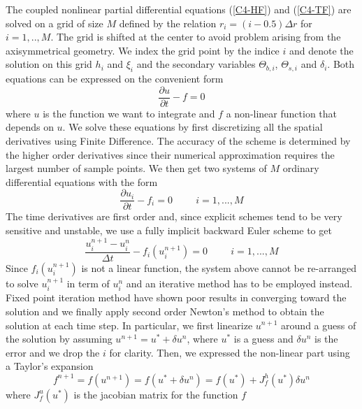 The coupled nonlinear partial differential equations (\ref{C4-HF}) and
(\ref{C4-TF}) are solved on a grid of size $M$ defined by the relation
$r_i =  (i-0.5)\Delta r$ for  $i=1,..,M$. The  grid is shifted  at the
center to avoid  problem arising from the  axisymmetrical geometry. We
index the grid point by the indice $i$ and denote the solution on this
grid  $h_i$ and  $\xi_i$ and  the secondary  variables $\Theta_{b,i}$,
$\Theta_{s,i}$ and $\delta_i$. Both equations  can be expressed on the
convenient form
\begin{equation}
  \frac{\partial u}{\partial t} - f = 0
\end{equation}
where $u$  is the function we  want to integrate and  $f$ a non-linear
function  that depends  on $u$.   We  solve these  equations by  first
discretizing all the spatial  derivatives using Finite Difference. The
accuracy of the  scheme is determined by the  higher order derivatives
since  their numerical  approximation requires  the largest  number of
sample points.  We  then get two systems of  $M$ ordinary differential
equations with the form
\begin{equation}
  \frac{\partial u_i}{\partial t} - f_i = 0 \hspace{1cm} i = 1,...,M
\end{equation}
The time derivatives are first  order and, since explicit schemes tend
to be  very sensitive and unstable,  we use a fully  implicit backward
Euler scheme to get
\begin{equation}
  \frac{u_i^{n+1}-u_i^n}{\Delta t} - f_i(u_i^{n+1}) = 0 \hspace{1cm} i
  = 1,...,M
  \label{C4-Num-1}
\end{equation}
Since  $f_i(u_i^{n+1})$ is  not a  linear function,  the system  above
cannot be re-arranged to solve $u_i^{n+1}$ in term of $u_i^{n}$ and an
iterative method  has to  be employed  instead. Fixed  point iteration
method have shown  poor results in converging toward  the solution and
we finally apply  second order Newton's method to  obtain the solution
at each time step.  In particular, we first linearize $u^{n+1}$ around
a guess  of the solution  by assuming $u^{n+1}=u^*+\delta  u^n$, where
$u^*$ is a guess and $\delta u^n$ is the error and we drop the $i$ for
clarity.   Then, we  expressed the  non-linear part  using a  Taylor's
expansion
\begin{equation}
  f^{n+1}=f(u^{n+1})=f(u^*+\delta
  u^n)=f(u^*)+J^h_{f}(u^*)\delta u^n\nonumber
\end{equation}
where  $J^u_{f}(u^*)$ is  the  jacobian matrix  for  the function  $f$
